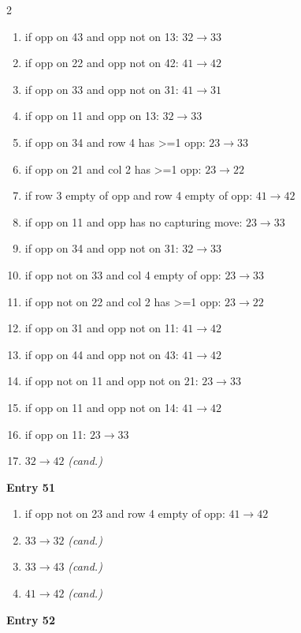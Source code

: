 \begin{multicols}{2}
\begin{tikzpicture}[scale=0.24]
\end{tikzpicture}
\nopagebreak\begin{enumerate}[topsep=1pt,itemsep=0pt,parsep=0pt,leftmargin=2.2em,label=\arabic*.]
\item if opp on 43 and opp not on 13: $32\!\to\!33$
\item if opp on 22 and opp not on 42: $41\!\to\!42$
\item if opp on 33 and opp not on 31: $41\!\to\!31$
\item if opp on 11 and opp on 13: $32\!\to\!33$
\item if opp on 34 and row 4 has >=1 opp: $23\!\to\!33$
\item if opp on 21 and col 2 has >=1 opp: $23\!\to\!22$
\item if row 3 empty of opp and row 4 empty of opp: $41\!\to\!42$
\item if opp on 11 and opp has no capturing move: $23\!\to\!33$
\item if opp on 34 and opp not on 31: $32\!\to\!33$
\item if opp not on 33 and col 4 empty of opp: $23\!\to\!33$
\item if opp not on 22 and col 2 has >=1 opp: $23\!\to\!22$
\item if opp on 31 and opp not on 11: $41\!\to\!42$
\item if opp on 44 and opp not on 43: $41\!\to\!42$
\item if opp not on 11 and opp not on 21: $23\!\to\!33$
\item if opp on 11 and opp not on 14: $41\!\to\!42$
\item if opp on 11: $23\!\to\!33$
\item $32\!\to\!42$ \hfill\textit{(cand.)}
\end{enumerate}\smallskip
\noindent\textbf{Entry 51} \; 
\nopagebreak\begin{enumerate}[topsep=1pt,itemsep=0pt,parsep=0pt,leftmargin=2.2em,label=\arabic*.]
\item if opp not on 23 and row 4 empty of opp: $41\!\to\!42$
\item $33\!\to\!32$ \hfill\textit{(cand.)}
\item $33\!\to\!43$ \hfill\textit{(cand.)}
\item $41\!\to\!42$ \hfill\textit{(cand.)}
\end{enumerate}\smallskip
\noindent\textbf{Entry 52} \; 
\end{multicols}
